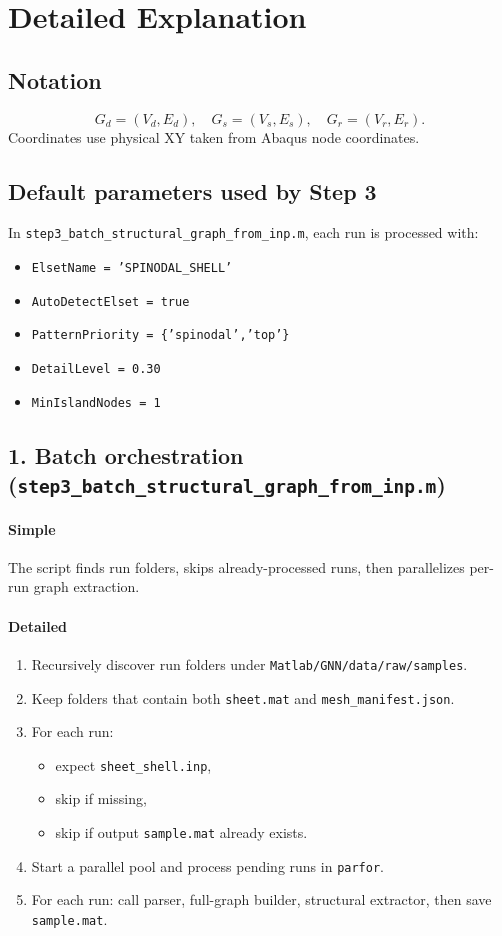 \documentclass[11pt]{article}
\begin{document}
\section{Detailed Explanation}

\subsection*{Notation}
\[
G_d = (V_d, E_d), \quad
G_s = (V_s, E_s), \quad
G_r = (V_r, E_r).
\]
Coordinates use physical XY taken from Abaqus node coordinates.

\subsection*{Default parameters used by Step 3}
In \texttt{step3\_batch\_structural\_graph\_from\_inp.m}, each run is processed with:
\begin{itemize}
  \item \texttt{ElsetName = 'SPINODAL\_SHELL'}
  \item \texttt{AutoDetectElset = true}
  \item \texttt{PatternPriority = \{'spinodal','top'\}}
  \item \texttt{DetailLevel = 0.30}
  \item \texttt{MinIslandNodes = 1}
\end{itemize}

\subsection*{1. Batch orchestration (\texttt{step3\_batch\_structural\_graph\_from\_inp.m})}
\paragraph{Simple}
The script finds run folders, skips already-processed runs, then parallelizes per-run graph extraction.

\paragraph{Detailed}
\begin{enumerate}
  \item Recursively discover run folders under \texttt{Matlab/GNN/data/raw/samples}.
  \item Keep folders that contain both \texttt{sheet.mat} and \texttt{mesh\_manifest.json}.
  \item For each run:
  \begin{itemize}
    \item expect \texttt{sheet\_shell.inp},
    \item skip if missing,
    \item skip if output \texttt{sample.mat} already exists.
  \end{itemize}
  \item Start a parallel pool and process pending runs in \texttt{parfor}.
  \item For each run: call parser, full-graph builder, structural extractor, then save \texttt{sample.mat}.
\end{enumerate}
\end{document}

